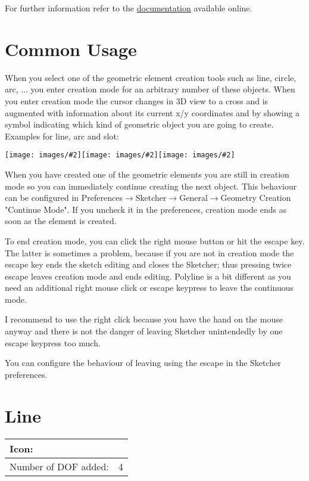 \documentclass[12pt,titlepage]{article}
\newcommand{\menu}{\mbox{$\rightarrow$}}
\newcommand{\icon}[1]{\raisebox{-1em}{\rule{0pt}{27pt}\texttt{[image: images/\#1]}}}
\newcommand{\img}[2]{\vspace{2ex}\noindent\texttt{[image: images/\#2]}}
\newcommand{\dofAdded}{Number of DOF added:}
\begin{document}
For further information refer to the \href{https://www.freecadweb.org/wiki/Sketcher_Workbench}{documentation} available online.

\section{Common Usage} When you select one of the geometric element creation tools such as line, circle, arc, ... you enter creation mode for an arbitrary number of these objects. When you enter creation mode the cursor changes in 3D view to a cross and is augmented with information about its current x/y coordinates and by showing a symbol indicating which kind of geometric object you are going to create. Examples for line, arc and slot:

\img{width=0.3\textwidth}{CursorLine}\hfill \img{width=0.3\textwidth}{CursorArc}\hfill \img{width=0.3\textwidth}{CursorSlot}

When you have created one of the geometric elements you are still in creation mode so you can immediately continue creating the next object. This behaviour can be configured in Preferences\menu Sketcher\menu General\menu Geometry Creation "Continue Mode". If you uncheck it in the preferences, creation mode ends as soon as the element is created.

To end creation mode, you can click the right mouse button or hit the escape key. The latter is sometimes a problem, because if you are not in creation mode the escape key ends the sketch editing and closes the Sketcher; thus pressing twice escape leaves creation mode and ends editing. Polyline is a bit different as you need an additional right mouse click or escape keypress to leave the continuous mode.

I recommend to use the right click because you have the hand on the mouse anyway and there is not the danger of leaving Sketcher unintendedly by one escape keypress too much.

You can configure the behaviour of leaving using the escape in the Sketcher preferences.

\section{Line} \begin{tabular}{|l|l|} \hline Icon: & \icon{Sketcher_CreateLine}\\ \hline \dofAdded & 4\\ \hline \end{tabular}
\end{document}
